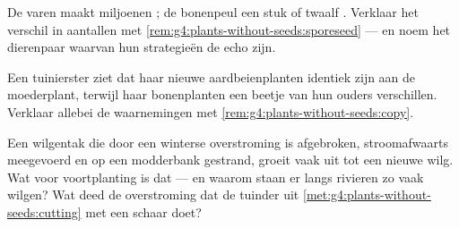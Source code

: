 \begin{exercise}[$\star\star$]\label{exo:g4:plants-without-seeds:9}
De varen maakt miljoenen ; de bonenpeul een stuk of twaalf .
Verklaar het verschil in aantallen met
\cref{rem:g4:plants-without-seeds:sporeseed} --- en noem het dierenpaar
waarvan hun strategieën de echo zijn.
\end{exercise}

\begin{exercise}[$\star\star$]\label{exo:g4:plants-without-seeds:10}
Een tuinierster ziet dat haar nieuwe aardbeienplanten identiek zijn aan
de moederplant, terwijl haar bonenplanten een beetje van hun ouders
verschillen. Verklaar allebei de waarnemingen met
\cref{rem:g4:plants-without-seeds:copy}.
\end{exercise}

\begin{exercise}[$\star\star\star$]\label{exo:g4:plants-without-seeds:11}
Een wilgentak die door een winterse overstroming is afgebroken,
stroomafwaarts meegevoerd en op een modderbank gestrand, groeit vaak
uit tot een nieuwe wilg. Wat voor voortplanting is dat --- en waarom
staan er langs rivieren zo vaak wilgen? Wat deed de overstroming dat de
tuinder uit \cref{met:g4:plants-without-seeds:cutting} met een schaar doet?
\end{exercise}
